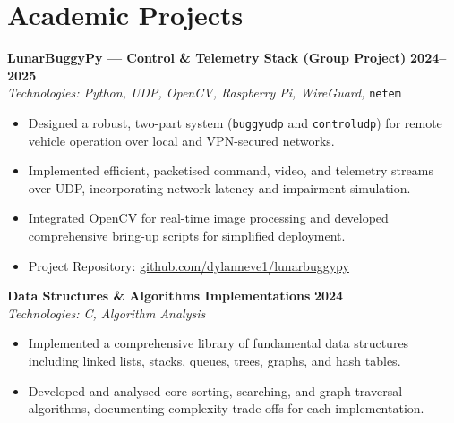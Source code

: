 \documentclass[10pt,a4paper]{article}
\begin{document}
\section*{Academic Projects}
\textbf{LunarBuggyPy --- Control \& Telemetry Stack (Group Project)} \hfill \textbf{2024--2025} \\
\textit{Technologies: Python, UDP, OpenCV, Raspberry Pi, WireGuard,} \texttt{netem}
\begin{itemize}
    \item Designed a robust, two-part system (\texttt{buggyudp} and \texttt{controludp}) for remote vehicle operation over local and VPN-secured networks.
    \item Implemented efficient, packetised command, video, and telemetry streams over UDP, incorporating network latency and impairment simulation.
    \item Integrated OpenCV for real-time image processing and developed comprehensive bring-up scripts for simplified deployment.
    \item Project Repository: \href{https://github.com/dylanneve1/lunarbuggypy}{github.com/dylanneve1/lunarbuggypy}
\end{itemize}
\medskip
\textbf{Data Structures \& Algorithms Implementations} \hfill \textbf{2024} \\
\textit{Technologies: C, Algorithm Analysis}
\begin{itemize}
    \item Implemented a comprehensive library of fundamental data structures including linked lists, stacks, queues, trees, graphs, and hash tables.
    \item Developed and analysed core sorting, searching, and graph traversal algorithms, documenting complexity trade-offs for each implementation.
\end{itemize}


\end{document}
